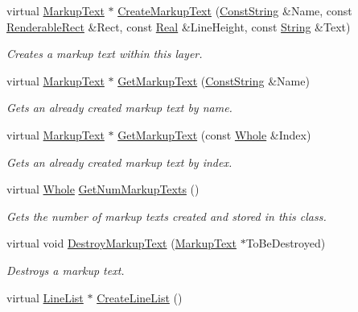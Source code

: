 \begin{DoxyCompactItemize}
virtual \hyperlink{classphys_1_1UI_1_1MarkupText}{MarkupText} $\ast$ \hyperlink{classphys_1_1UI_1_1Layer_a556d60552d49483bda837b27fcb0f985}{CreateMarkupText} (\hyperlink{namespacephys_a5ce5049f8b4bf88d6413c47b504ebb31}{ConstString} \&Name, const \hyperlink{structphys_1_1UI_1_1RenderableRect}{RenderableRect} \&Rect, const \hyperlink{namespacephys_af7eb897198d265b8e868f45240230d5f}{Real} \&LineHeight, const \hyperlink{namespacephys_aa03900411993de7fbfec4789bc1d392e}{String} \&Text)
\begin{DoxyCompactList}\small\item\em Creates a markup text within this layer. \item\end{DoxyCompactList}\item 
virtual \hyperlink{classphys_1_1UI_1_1MarkupText}{MarkupText} $\ast$ \hyperlink{classphys_1_1UI_1_1Layer_aed2d7a1ad478f3d92005aeec4a777473}{GetMarkupText} (\hyperlink{namespacephys_a5ce5049f8b4bf88d6413c47b504ebb31}{ConstString} \&Name)
\begin{DoxyCompactList}\small\item\em Gets an already created markup text by name. \item\end{DoxyCompactList}\item 
virtual \hyperlink{classphys_1_1UI_1_1MarkupText}{MarkupText} $\ast$ \hyperlink{classphys_1_1UI_1_1Layer_ae69320aefcfbc6f7f8c7364a04b2ae59}{GetMarkupText} (const \hyperlink{namespacephys_a460f6bc24c8dd347b05e0366ae34f34a}{Whole} \&Index)
\begin{DoxyCompactList}\small\item\em Gets an already created markup text by index. \item\end{DoxyCompactList}\item 
virtual \hyperlink{namespacephys_a460f6bc24c8dd347b05e0366ae34f34a}{Whole} \hyperlink{classphys_1_1UI_1_1Layer_acc0fbbeabb701ad86826312b2ce88d60}{GetNumMarkupTexts} ()
\begin{DoxyCompactList}\small\item\em Gets the number of markup texts created and stored in this class. \item\end{DoxyCompactList}\item 
virtual void \hyperlink{classphys_1_1UI_1_1Layer_a30a9991d13023b2bb941dab0667f91e6}{DestroyMarkupText} (\hyperlink{classphys_1_1UI_1_1MarkupText}{MarkupText} $\ast$ToBeDestroyed)
\begin{DoxyCompactList}\small\item\em Destroys a markup text. \item\end{DoxyCompactList}\item 
\hypertarget{classphys_1_1UI_1_1Layer_a16c50950bb79c8b06a046f2820329728}{
virtual \hyperlink{classphys_1_1UI_1_1LineList}{LineList} $\ast$ \hyperlink{classphys_1_1UI_1_1Layer_a16c50950bb79c8b06a046f2820329728}{CreateLineList} ()}
\label{classphys_1_1UI_1_1Layer_a16c50950bb79c8b06a046f2820329728}


\end{DoxyCompactItemize}
